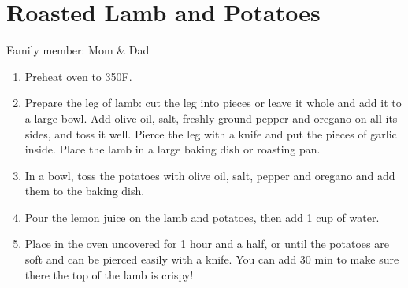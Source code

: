 \chapter{Roasted Lamb and Potatoes}
\label{ch:lambpotatoes}

Family member: Mom \& Dad


\begin{enumerate}
    \item Preheat oven to 350\degree F.
    \item Prepare the leg of lamb: cut the leg into pieces or leave it whole and add it to a large bowl.  Add olive oil, salt, freshly ground pepper and oregano on all its sides, and toss it well. Pierce the leg with a knife and put the pieces of garlic inside. Place the lamb in a large baking dish or roasting pan.
    \item In a bowl, toss the potatoes with olive oil, salt, pepper and oregano and add them to the baking dish.
    \item Pour the lemon juice on the lamb and potatoes, then add 1 cup of water.
    \item Place in the oven uncovered for 1 hour and a half, or until the potatoes are soft and can be pierced easily with a knife. You can add 30 min to make sure there the top of the lamb is crispy!
\end{enumerate}

